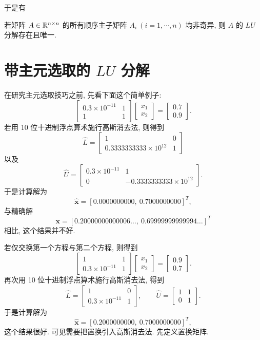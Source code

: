 于是有

\begin{theorem}
\label{thm:2-2}
若矩阵 $A\in\mathbb{R}^{n\times n}$ 的所有顺序主子矩阵 $A_i\ (i=1,\cdots,n)$ 均非奇异, 则 $A$ 的 $LU$ 分解存在且唯一.
\end{theorem}

\section{带主元选取的 $LU$ 分解}

在研究主元选取技巧之前, 先看下面这个简单例子:
\[
  \begin{bmatrix}
    0.3\times10^{-11} & 1\\
    1                 & 1
  \end{bmatrix}
  \begin{bmatrix}
    x_1\\ x_2
  \end{bmatrix}
  =
  \begin{bmatrix}
    0.7\\ 0.9
  \end{bmatrix}.
\]
若用 10 位十进制浮点算术施行高斯消去法, 则得到
\[
  \widehat{L}=
  \begin{bmatrix}
    1 & 0\\
    0.3333333333\times10^{12} & 1
  \end{bmatrix}
\]
以及
\[
  \widehat{U}=
  \begin{bmatrix}
    0.3\times10^{-11} & 1\\
    0 & -0.3333333333\times10^{12}
  \end{bmatrix}.
\]
于是计算解为
\[
  \hat{\mathbf{x}}=[0.0000000000,\ 0.7000000000]^T,
\]
与精确解
\[
  \mathbf{x}=[0.20000000000006\ldots,\ 0.69999999999994\ldots]^T
\]
相比, 这个结果并不好.

若仅交换第一个方程与第二个方程, 则得到
\[
  \begin{bmatrix}
    1                 & 1\\
    0.3\times10^{-11} & 1
  \end{bmatrix}
  \begin{bmatrix}
    x_1\\ x_2
  \end{bmatrix}
  =
  \begin{bmatrix}
    0.9\\ 0.7
  \end{bmatrix}.
\]
再次用 10 位十进制浮点算术施行高斯消去法, 得到
\[
  \widehat{L}=
  \begin{bmatrix}
    1 & 0\\
    0.3\times10^{-11} & 1
  \end{bmatrix},
  \qquad
  \widehat{U}=
  \begin{bmatrix}
    1 & 1\\
    0 & 1
  \end{bmatrix}.
\]
于是计算解为
\[
  \hat{\mathbf{x}}=[0.2000000000,\ 0.7000000000]^T,
\]
这个结果很好. 可见需要把置换引入高斯消去法. 先定义置换矩阵.

